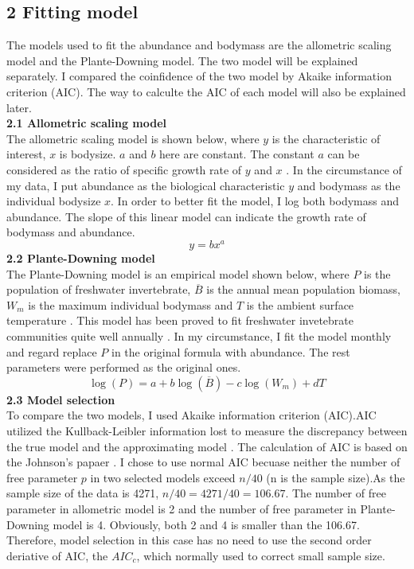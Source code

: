 \documentclass[11pt]{article}
\begin{document}
\begin{linenumbers}
\section*{2 Fitting model}
The models used to fit the abundance and bodymass are the allometric scaling model and the Plante-Downing model. The two model will be explained separately.
I compared the coinfidence of the two model by Akaike information criterion (AIC). The way to calculte the AIC of each model will also be explained later.   \\
\textbf{2.1 Allometric scaling model} \\
The allometric scaling model is shown below, where $y$ is the characteristic of interest, $x$ is bodysize. $a$ and $b$ here are constant.
The constant $a$ can be considered as the ratio of specific growth rate of $y$ and $x$ \cite{huxley1950relative}.
In the circumstance of my data, I put abundance as the biological characteristic $y$ and bodymass as the individual bodysize $x$.
In order to better fit the model, I log both bodymass and abundance.
The slope of this linear model can indicate the growth rate of bodymass and abundance.
\begin{equation}
     y= b x^a
\end{equation}
\textbf{2.2 Plante-Downing model} \\
The Plante-Downing model is an empirical model shown below, where $P$ is the population of freshwater invertebrate, $\overline{B}$ is the annual mean population biomass, $\mathit{W}_{m}$ is the maximum individual bodymass and $T$ is the ambient surface temperature \cite{plante1989production}.
This model has been proved to fit freshwater invetebrate communities quite well annually \cite{plante1989production}.
In my circumstance, I fit the model monthly and regard replace $P$ in the original formula with abundance. The rest parameters were performed as the original ones.
\begin{equation}
     \log(P) = a +b \log(\overline{B}) - c \log(\mathit{W}_{m}) + d T
\end{equation}
\textbf{2.3 Model selection} \\
To compare the two models, I used Akaike information criterion (AIC).AIC utilized the Kullback-Leibler information lost to measure the discrepancy between the true model and the approximating model \cite{wagenmakers2004aic}. The calculation of AIC is based on the Johnson's papaer \cite{johnson2004model}. I chose to use normal AIC becuase neither the number of free parameter $p$ in two selected models exceed $n/40$ (n is the sample size).As the sample size of the data is 4271,  $n/40 =4271/40 = 106.67 $. The number of free parameter in allometric model is 2 and the number of free parameter in Plante-Downing model is 4. Obviously, both 2 and 4 is smaller than the 106.67. Therefore, model selection in this case has no need to use the second order deriative of AIC, the $\mathit{AIC}_{c}$, which normally used to correct small sample size. \\

\end{linenumbers}
\end{document}
